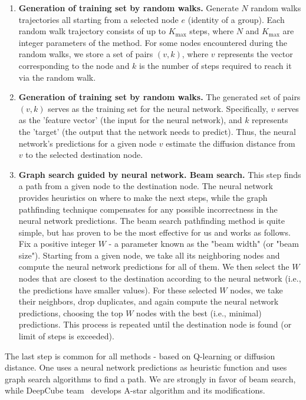 \documentclass[atmp]{ipart_v1}
\numberwithin{equation}{section}
\theoremstyle{plain}%
\begin{document}
\begin{enumerate}
    \item {\bf Generation of training set by random walks.} 
    Generate $N$ random walks trajectories all starting from a selected node $e$ (identity of a group). Each random walk trajectory consists of up to $K_{\text{max}}$ steps, where $N$ and $K_{\text{max}}$ are integer parameters of the method. For some nodes encountered during the random walks, we store a set of pairs $(v, k)$, where $v$ represents the vector corresponding to the node and $k$ is the number of steps required to reach it via the random walk. 
    \item {\bf Generation of training set by random walks.}  The generated set of pairs $(v, k)$ serves as the training set for the neural network. Specifically, $v$ serves as the 'feature vector' (the input for the neural network), and $k$ represents the 'target' (the output that the network needs to predict). Thus, the neural network's predictions for a given node $v$ estimate the diffusion distance from $v$ to the selected destination node.
    \item {\bf Graph search guided by neural network. Beam search.} This step finds a path from a given node to the destination node. The neural network provides heuristics on where to make the next steps, while the graph pathfinding technique compensates for any possible incorrectness in the neural network predictions. The beam search pathfinding method is quite simple, but has proven to be the most effective for us and works as follows. Fix a positive integer $W$ - a parameter known as the "beam width" (or "beam size"). 
    Starting from a given node, we take all its neighboring nodes and compute the neural network predictions for all of them. We then select the $W$ nodes that are closest to the destination according to the neural network (i.e., the predictions have smaller values). For these selected $W$ nodes, we take their neighbors, drop duplicates, and again compute the neural network predictions, choosing the top $W$ nodes with the best (i.e., minimal) predictions. This process is repeated until the destination node is found (or limit of steps is exceeded).
  
\end{enumerate}

The last step is common for all methods - based on Q-learning or diffusion distance. One uses a neural network predictions as heuristic function and uses graph search algorithms to find a path. We are strongly in favor of beam search, while DeepCube team~\cite{mcaleer2019solving, agostinelli2019solving, khandelwal2024towards,agostinelli2024q} develops A-star algorithm and its modifications.
\end{document}
